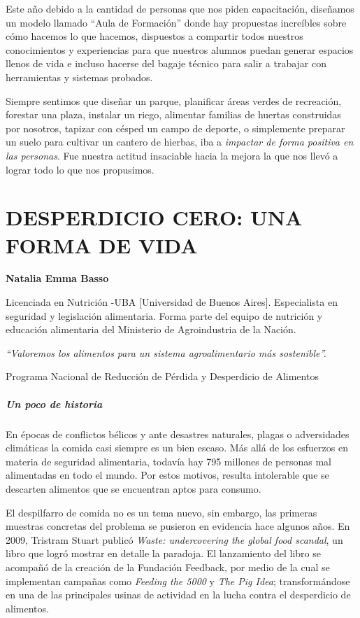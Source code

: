 \documentclass[
]{article}
\begin{document}
Este año debido a la cantidad de personas que nos piden capacitación,
diseñamos un modelo llamado ``Aula de Formación'' donde hay propuestas
increíbles sobre cómo hacemos lo que hacemos, dispuestos a compartir
todos nuestros conocimientos y experiencias para que nuestros alumnos
puedan generar espacios llenos de vida e incluso hacerse del bagaje
técnico para salir a trabajar con herramientas y sistemas probados.

Siempre sentimos que diseñar un parque, planificar áreas verdes de
recreación, forestar una plaza, instalar un riego, alimentar familias de
huertas construidas por nosotros, tapizar con césped un campo de
deporte, o simplemente preparar un suelo para cultivar un cantero de
hierbas, iba a \emph{impactar de forma positiva en las personas}. Fue
nuestra actitud insaciable hacia la mejora la que nos llevó a lograr
todo lo que nos propusimos.

\cleardoublepage

\hypertarget{desperdicio-cero-una-forma-de-vida}{%
\section{DESPERDICIO CERO: UNA FORMA DE
VIDA}\label{desperdicio-cero-una-forma-de-vida}}

\textbf{Natalia Emma Basso}

Licenciada en Nutrición -UBA {[}Universidad de Buenos Aires{]}.
Especialista en seguridad y legislación alimentaria. Forma parte del
equipo de nutrición y educación alimentaria del Ministerio de
Agroindustria de la Nación.

\emph{``Valoremos los alimentos para un sistema agroalimentario más
sostenible''.}

Programa Nacional de Reducción de Pérdida y Desperdicio de Alimentos

\hypertarget{un-poco-de-historia}{%
\subparagraph{Un poco de historia}\label{un-poco-de-historia}}

En épocas de conflictos bélicos y ante desastres naturales, plagas o
adversidades climáticas la comida casi siempre es un bien escaso. Más
allá de los esfuerzos en materia de seguridad alimentaria, todavía hay
795 millones de personas mal alimentadas en todo el mundo. Por estos
motivos, resulta intolerable que se descarten alimentos que se
encuentran aptos para consumo.

El despilfarro de comida no es un tema nuevo, sin embargo, las primeras
muestras concretas del problema se pusieron en evidencia hace algunos
años. En 2009, Tristram Stuart publicó \emph{Waste: undercovering the
global food scandal}, un libro que logró mostrar en detalle la paradoja.
El lanzamiento del libro se acompañó de la creación de la Fundación
Feedback, por medio de la cual se implementan campañas como
\emph{Feeding the 5000} y \emph{The Pig Idea}; transformándose en una de
las principales usinas de actividad en la lucha contra el desperdicio de
alimentos.
\end{document}
